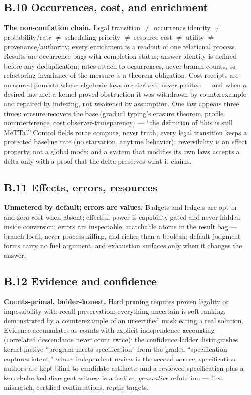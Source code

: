 \documentclass[11pt]{article}
\begin{document}
\subsection*{B.10 Occurrences, cost, and enrichment}
\textbf{The non-conflation chain.}  Legal transition $\neq$ occurrence
identity $\neq$ probability/rate $\neq$ scheduling priority $\neq$
resource cost $\neq$ utility $\neq$ provenance/authority; every
enrichment is a readout of one relational process.  Results are
occurrence bags with completion status; answer identity is defined before
any deduplication; rates attach to occurrences, never branch counts, so
refactoring-invariance of the measure is a theorem obligation.  Cost
receipts are measured pomsets whose algebraic laws are derived, never
posited --- and when a desired law met a kernel-proved obstruction it was
withdrawn by counterexample and repaired by indexing, not weakened by
assumption.  One law appears three times: erasure recovers the base
(gradual typing's erasure theorem, profile noninterference, cost
observer-transparency) --- ``the definition of `this is still MeTTa'.''
Control fields route compute, never truth; every legal transition keeps a
protected baseline rate (no starvation, anytime behavior); reversibility
is an effect property, not a global mode; and a system that modifies its
own laws accepts a delta only with a proof that the delta preserves what
it claims.

\subsection*{B.11 Effects, errors, resources}
\textbf{Unmetered by default; errors are values.}  Budgets and ledgers
are opt-in and zero-cost when absent; effectful power is capability-gated
and never hidden inside conversion; errors are inspectable, matchable
atoms in the result bag --- branch-local, never process-killing, and
richer than a boolean; default judgment forms carry no fuel argument, and
exhaustion surfaces only when it changes the answer.

\subsection*{B.12 Evidence and confidence}
\textbf{Counts-primal, ladder-honest.}  Hard pruning requires proven
legality or impossibility with recall preservation; everything uncertain
is soft ranking, demonstrated by a counterexample of an uncertified mask
eating a real solution.  Evidence accumulates as counts with explicit
independence accounting (correlated descendants never count twice); the
confidence ladder distinguishes kernel-factive ``program meets
specification'' from the graded ``specification captures intent,'' whose
independent review is the second source; specification authors are kept
blind to candidate artifacts; and a reviewed specification plus a
kernel-checked divergent witness is a factive, \emph{generative}
refutation --- first mismatch, certified continuations, repair targets.
\end{document}
